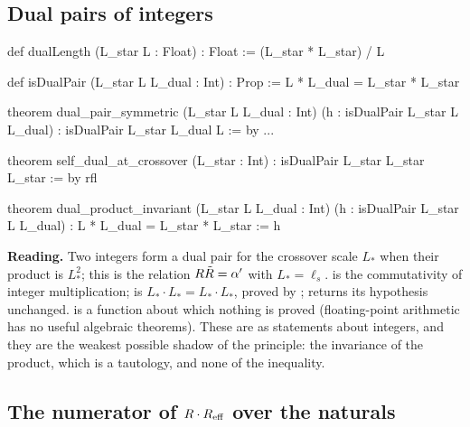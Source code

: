 \subsection{Dual pairs of integers}

\begin{leanbox}
\begin{leancode}
def dualLength (L_star L : Float) : Float := (L_star * L_star) / L

def isDualPair (L_star L L_dual : Int) : Prop := L * L_dual = L_star * L_star

theorem dual_pair_symmetric (L_star L L_dual : Int)
    (h : isDualPair L_star L L_dual) : isDualPair L_star L_dual L := by ...

theorem self_dual_at_crossover (L_star : Int) :
    isDualPair L_star L_star L_star := by rfl

theorem dual_product_invariant (L_star L L_dual : Int)
    (h : isDualPair L_star L L_dual) : L * L_dual = L_star * L_star := h
\end{leancode}
\textbf{Reading.} Two integers form a dual pair for the crossover scale $L_*$ when their
product is $L_*^2$; this is the relation $R\tilde R=\alpha'$ with $L_*=\ell_s$.
 is the commutativity of integer multiplication;
 is $L_*\cdot L_*=L_*\cdot L_*$, proved by ;
 returns its hypothesis unchanged.  is a
 function about which nothing is proved (floating-point arithmetic has no useful
algebraic theorems). These are \TA{} as statements about integers, and they are the weakest
possible shadow of the principle: the invariance of the product, which is a tautology, and
none of the inequality.
\end{leanbox}

\subsection{The numerator of \texorpdfstring{$R\cdot R_{\rm eff}$}{R times R\_eff} over the naturals}

